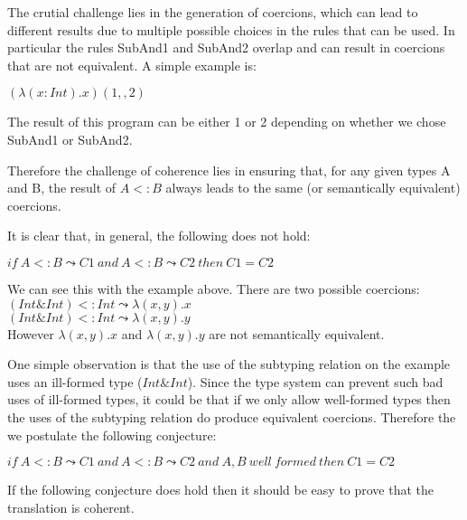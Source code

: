 \documentclass[nocopyrightspace,preprint,times,9pt]{sigplanconf}
\begin{document}
The crutial challenge lies in the generation of coercions, which can lead
to different results due to multiple possible choices in the rules that
can be used. In particular the rules SubAnd1 and SubAnd2 overlap and
can result in coercions that are not equivalent. A simple example is:

$(\lambda (x:Int) . x) (1,,2)$

The result of this program can be either 1 or 2 depending on whether
we chose SubAnd1 or SubAnd2.

Therefore the challenge of coherence lies in ensuring that, for any given
types A and B, the result of $A <: B$ always leads to the same (or semantically
equivalent) coercions.

It is clear that, in general, the following does not hold:

$if~A <: B \leadsto C1~and~A <: B \leadsto C2~then~C1 = C2$

We can see this with the example above. There are two possible coercions:\\

\noindent $(Int\&Int) <: Int \leadsto \lambda (x,y). x$\\
$(Int\&Int) <: Int \leadsto \lambda (x,y). y$\\

However $\lambda (x,y). x$ and $\lambda (x,y). y$ are not semantically equivalent.

One simple observation is that the use of the subtyping relation on the
example uses an ill-formed type ($Int\&Int$). Since the type system can prevent
such bad uses of ill-formed types, it could be that if we only allow well-formed
types then the uses of the subtyping relation do produce equivalent coercions.
Therefore the we postulate the following conjecture:

$if~A <: B \leadsto C1~and~A <: B \leadsto C2~and~A, B~well~formed~then~C1 = C2$

If the following conjecture does hold then it should be easy to prove that
the translation is coherent.


\end{document}
